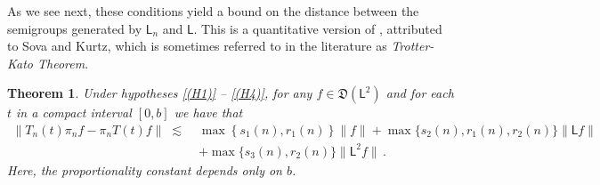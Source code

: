 \documentclass[12pt,a4paper]{article}
\theoremstyle{plain}
\newtheorem{theorem}{Theorem}[section]
\theoremstyle{remark}
\newcommand{\msf}[1]{{\mathsf #1}}
\newcommand{\mf}[1]{{\mathfrak #1}}
\newcommand{\norm}[1]{\lVert#1\rVert}
\begin{document}
	
	As we see next, these conditions  yield a bound on the distance between the semigroups generated by $\msf L_n$ and $\msf L$.
	This is a quantitative version of \citet[Theorem 6.1, p. 28]{EK}, attributed  to Sova and Kurtz,  which  is sometimes referred to  in the literature as \textit{Trotter-Kato Theorem}.
	\begin{theorem}\label{thm21}
		Under hypotheses  \ref{(H1)} -- \ref{(H4)}, for any $f \in \mf{D}(\msf{L}^2)$ and for each $t$ in a compact interval $[0,b]$ we have that
		\begin{align*}%
			\norm{{T}_n(t)\pi_nf - \pi_nT(t)f}\;\lesssim\; & \max\left\{s_1(n),r_1(n)\right\}\norm{f} +\max\big\{s_2(n),r_1(n),r_2(n)\big\}\norm{\msf{L}f}\\
			&+\max\big\{s_3(n),r_2(n)\big\}\norm{\msf{L}^2f}\,.
		\end{align*}
		Here, the proportionality constant depends only on $b$.
	\end{theorem}
	
	
	
\end{document}
